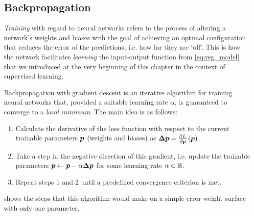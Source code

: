 \documentclass[../report.tex]{subfiles}
\begin{document}
\subsection{Backpropagation}
\emph{Training} with regard to neural networks refers to the process of altering a network's weights and biases with the goal of achieving an optimal configuration that reduces the error of the predictions, i.e. how far they are `off'. 
This is how the network facilitates \emph{learning} the input-output function from \cref{eq:reg_model} that we introduced at the very beginning of this chapter in the context of supervised learning.

Backpropagation with gradient descent is an iterative algorithm for training neural networks that, provided a suitable learning rate $\alpha$, is guaranteed to converge to a \emph{local minimum}.
The main idea is as follows:
\begin{enumerate}
    \item Calculate the derivative of the loss function with respect to the current trainable parameters ${\bm{p}}$ (weights and biases) as
        $\bm{\Delta p} = \frac{\partial L}{\partial {\bm{p}}}\left({\bm{p}}\right)$.
    \item Take a step in the negative direction of this gradient, i.e. update the trainable parameters ${\bm{p}} \leftarrow {\bm{p}} - \alpha \bm{\Delta p}$ for some learning rate $\alpha \in \mathbb{R}$.
    \item Repeat steps 1 and 2 until a predefined convergence criterion is met.
\end{enumerate}
 shows the steps that this algorithm would make on a simple error-weight surface with only one parameter.
\end{document}
